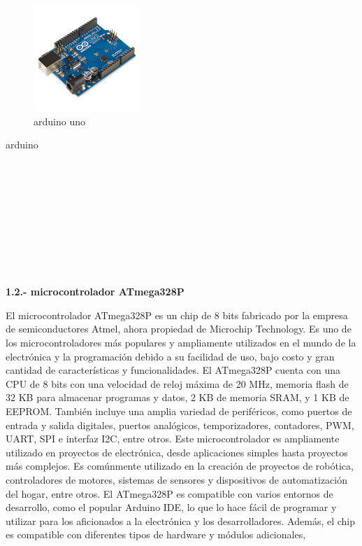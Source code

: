 \documentclass[11pt, letterpaper]{article}
\begin{document}
\begin{figure}[h!]
    \centering
    \includegraphics[height=4cm]{Arduino_Uno_-_R3.jpg}
    \caption{arduino uno }
    \label{fig:arduino uno }
\end{figure} 
arduino 
\\ \\
\\ \\
\\ \\
\\ \\
\\ \\
\begin{center}

    \textbf{1.2.- microcontrolador ATmega328P}
\end{center}
El microcontrolador ATmega328P es un chip de 8 bits fabricado por la empresa de semiconductores Atmel, ahora propiedad de Microchip Technology. 
Es uno de los microcontroladores más populares y ampliamente utilizados en el mundo de la electrónica y la programación debido a su facilidad de uso, 
bajo costo y gran cantidad de características y funcionalidades.
El ATmega328P cuenta con una CPU de 8 bits con una velocidad de reloj máxima de 20 MHz, memoria flash de 32 KB para almacenar programas y datos,
2 KB de memoria SRAM, y 1 KB de EEPROM. También incluye una amplia variedad de periféricos, como puertos de entrada y salida digitales, 
puertos analógicos, temporizadores, contadores, PWM, UART, SPI e interfaz I2C, entre otros.
Este microcontrolador es ampliamente utilizado en proyectos de electrónica, desde aplicaciones simples hasta proyectos más complejos. 
Es comúnmente utilizado en la creación de proyectos de robótica, controladores de motores, sistemas de sensores y dispositivos de automatización 
del hogar, entre otros.
El ATmega328P es compatible con varios entornos de desarrollo, como el popular Arduino IDE, lo que lo hace fácil de programar y utilizar 
para los aficionados a la electrónica y los desarrolladores. Además, el chip es compatible con diferentes tipos de hardware y módulos adicionales, 
\end{document}
